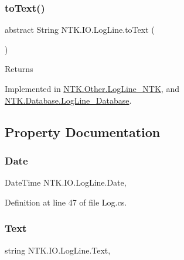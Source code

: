 \subsubsection{\texorpdfstring{toText()}{toText()}}
{\footnotesize\ttfamily abstract String N\+T\+K.\+I\+O.\+Log\+Line.\+to\+Text (\begin{DoxyParamCaption}{ }\end{DoxyParamCaption})\hspace{0.3cm}{\ttfamily [pure virtual]}}





\begin{DoxyReturn}{Returns}

\end{DoxyReturn}


Implemented in \mbox{\hyperlink{class_n_t_k_1_1_other_1_1_log_line___n_t_k_a78909435926da4947cbd12f28f612a4c}{N\+T\+K.\+Other.\+Log\+Line\+\_\+\+N\+TK}}, and \mbox{\hyperlink{class_n_t_k_1_1_database_1_1_log_line___database_afc948bed46fbef5c91852ce61c564311}{N\+T\+K.\+Database.\+Log\+Line\+\_\+\+Database}}.



\subsection{Property Documentation}
\mbox{\label{class_n_t_k_1_1_i_o_1_1_log_line_a716288c0308355faa9afa8458f175681}} 
\subsubsection{\texorpdfstring{Date}{Date}}
{\footnotesize\ttfamily Date\+Time N\+T\+K.\+I\+O.\+Log\+Line.\+Date\hspace{0.3cm}{\ttfamily [get]}, {\ttfamily [set]}}







Definition at line 47 of file Log.\+cs.

\mbox{\label{class_n_t_k_1_1_i_o_1_1_log_line_a8f518c7a9ca5ac98d3c8fd0c631b8983}} 
\subsubsection{\texorpdfstring{Text}{Text}}
{\footnotesize\ttfamily string N\+T\+K.\+I\+O.\+Log\+Line.\+Text\hspace{0.3cm}{\ttfamily [get]}, {\ttfamily [set]}}







